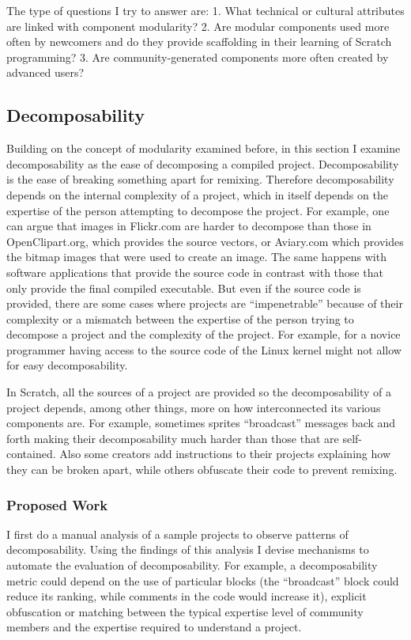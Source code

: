 The type of questions I try to answer are:
1. What technical or cultural attributes are linked with component modularity? 
2. Are modular components used more often by newcomers and do they provide scaffolding in their learning of Scratch programming?
3. Are community-generated components more often created by advanced users?

\subsection{Decomposability}
Building on the concept of modularity examined before, in this section I examine decomposability as the ease of decomposing a compiled project.
Decomposability is the ease of breaking something apart for remixing.
Therefore decomposability depends on the internal complexity of a project, which in itself depends on the expertise of the person attempting to decompose the project.
For example, one can argue that images in Flickr.com are harder to decompose than those in OpenClipart.org, which provides the source vectors, or Aviary.com which provides the bitmap images that were used to create an image.
The same happens with software applications that provide the source code in contrast with those that only provide the final compiled executable.
But even if the source code is provided, there are some cases where projects are ``impenetrable'' because of their complexity or a mismatch between the expertise of the person trying to decompose a project and the complexity of the project. 
For example, for a novice programmer having access to the source code of the Linux kernel might not allow for easy decomposability.

In Scratch, all the sources of a project are provided so the decomposability of a project depends, among other things, more on how interconnected its various components are. 
For example, sometimes sprites ``broadcast'' messages back and forth making their decomposability much harder than those that are self-contained.
Also some creators add instructions to their projects explaining how they can be broken apart, while others obfuscate their code to prevent remixing.

\subsubsection{Proposed Work}
I first do a manual analysis of a sample projects to observe patterns of decomposability. 
Using the findings of this analysis I devise mechanisms to automate the evaluation of decomposability. 
For example, a decomposability metric could depend on the use of particular blocks (the ``broadcast'' block could reduce its ranking, while comments in the code would increase it), explicit obfuscation or matching between the typical expertise level of community members and the expertise required to understand a project.

